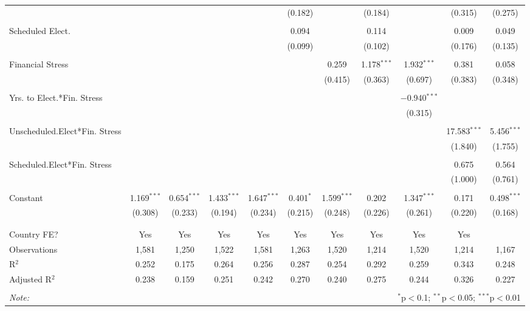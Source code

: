 \begin{table}[!htbp]
\begin{tabular}{@{\extracolsep{5pt}}lcccccccccc}
  &  &  &  &  & (0.182) &  & (0.184) &  & (0.315) & (0.275) \\ 
  & & & & & & & & & & \\ 
 Scheduled Elect. &  &  &  &  & 0.094 &  & 0.114 &  & 0.009 & 0.049 \\ 
  &  &  &  &  & (0.099) &  & (0.102) &  & (0.176) & (0.135) \\ 
  & & & & & & & & & & \\ 
 Financial Stress &  &  &  &  &  & 0.259 & 1.178$^{***}$ & 1.932$^{***}$ & 0.381 & 0.058 \\ 
  &  &  &  &  &  & (0.415) & (0.363) & (0.697) & (0.383) & (0.348) \\ 
  & & & & & & & & & & \\ 
 Yrs. to Elect.*Fin. Stress &  &  &  &  &  &  &  & $-$0.940$^{***}$ &  &  \\ 
  &  &  &  &  &  &  &  & (0.315) &  &  \\ 
  & & & & & & & & & & \\ 
 Unscheduled.Elect*Fin. Stress &  &  &  &  &  &  &  &  & 17.583$^{***}$ & 5.456$^{***}$ \\ 
  &  &  &  &  &  &  &  &  & (1.840) & (1.755) \\ 
  & & & & & & & & & & \\ 
 Scheduled.Elect*Fin. Stress &  &  &  &  &  &  &  &  & 0.675 & 0.564 \\ 
  &  &  &  &  &  &  &  &  & (1.000) & (0.761) \\ 
  & & & & & & & & & & \\ 
 Constant & 1.169$^{***}$ & 0.654$^{***}$ & 1.433$^{***}$ & 1.647$^{***}$ & 0.401$^{*}$ & 1.599$^{***}$ & 0.202 & 1.347$^{***}$ & 0.171 & 0.498$^{***}$ \\ 
  & (0.308) & (0.233) & (0.194) & (0.234) & (0.215) & (0.248) & (0.226) & (0.261) & (0.220) & (0.168) \\ 
  & & & & & & & & & & \\ 
\hline \\[-1.8ex] 
Country FE? & Yes & Yes & Yes & Yes & Yes & Yes & Yes & Yes & Yes &  \\ 
Observations & 1,581 & 1,250 & 1,522 & 1,581 & 1,263 & 1,520 & 1,214 & 1,520 & 1,214 & 1,167 \\ 
R$^{2}$ & 0.252 & 0.175 & 0.264 & 0.256 & 0.287 & 0.254 & 0.292 & 0.259 & 0.343 & 0.248 \\ 
Adjusted R$^{2}$ & 0.238 & 0.159 & 0.251 & 0.242 & 0.270 & 0.240 & 0.275 & 0.244 & 0.326 & 0.227 \\ 
\hline 
\hline \\[-1.8ex] 
\textit{Note:}  & \multicolumn{10}{r}{$^{*}$p$<$0.1; $^{**}$p$<$0.05; $^{***}$p$<$0.01} \\ 
\end{tabular} 
\end{table} 
